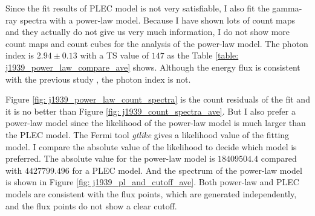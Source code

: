 \documentclass[a4paper, 12pt]{report}
\begin{document}
        Since the fit results of PLEC model is not very satisfiable, I also fit the 
        gamma-ray spectra with a power-law model. Because I have shown lots of count maps 
        and they actually do not give us very much information, I do not show more count maps 
        and count cubes for the analysis of the power-law model. The photon index is 
        $2.94\pm0.13$ with a TS value of $147$ as the Table 
        \ref{table: j1939_power_law_compare_ave} shows. Although the energy flux is consistent 
        with the previous study \cite{0004-637X-787-2-167}, the photon 
        index is not.
        \begin{table}[!htp]
          \centering
            \caption[Photon index comparison of power-law model between different 
              studies.]
              {Photon index comparison of power-law model between different 
              studies. The data of column Previous Results are from
              \cite{0004-637X-787-2-167}.}
            \label{table: j1939_power_law_compare_ave}        
        \end{table}  

        Figure \ref{fig: j1939_power_law_count_spectra} is the count residuals of the fit and 
        it is no better than Figure \ref{fig: j1939_count_spectra_ave}. But I also prefer a 
        power-law model since the likelihood of the power-law model is much larger than the 
        PLEC model. The Fermi tool \textit{gtlike} gives a likelihood value of the 
        fitting model. I compare the absolute value of the likelihood to decide which model 
        is preferred. The absolute value for the power-law model is $18409504.4$ compared with 
        $4427799.496$ for a PLEC model. And the spectrum of the power-law model is 
        shown in Figure \ref{fig: j1939_pl_and_cutoff_ave}. Both power-law and PLEC 
        models are consistent with the flux points, which are generated independently, and 
        the flux points do not show a clear cutoff. 
\end{document}
